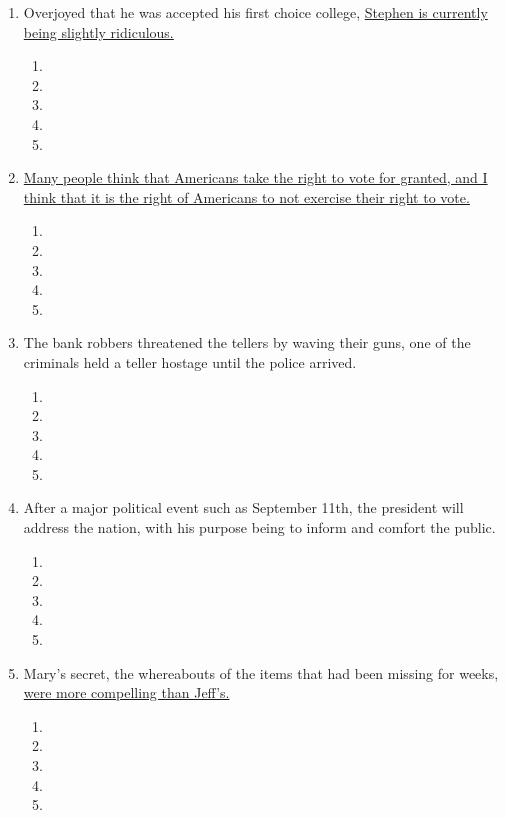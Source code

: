 \begin{enumerate}
\bigskip
\item Overjoyed that he was accepted his first choice college, \ul{Stephen is currently being slightly ridiculous.}

\bigskip
\begin{enumerate}[label=(\Alph*)]
\item\hrulefill
\item\hrulefill
\item\hrulefill
\item\hrulefill
\item\hrulefill
\end{enumerate}

\bigskip
\item \ul{Many people think that Americans take the right to vote for granted, and I think that it is the right of Americans to not exercise their right to vote.}

\bigskip
\begin{enumerate}[label=(\Alph*)]
\item\hrulefill
\item\hrulefill
\item\hrulefill
\item\hrulefill
\item\hrulefill
\end{enumerate}

\bigskip
\item The bank robbers threatened the tellers by waving their guns, one of the criminals held a teller hostage until the police arrived. 

\bigskip
\begin{enumerate}[label=(\Alph*)]
\item\hrulefill
\item\hrulefill
\item\hrulefill
\item\hrulefill
\item\hrulefill
\end{enumerate}

\bigskip
\item After a major political event such as September 11th, the president will address the nation, with his purpose being to inform and comfort the public.

\bigskip
\begin{enumerate}[label=(\Alph*)]
\item\hrulefill
\item\hrulefill
\item\hrulefill
\item\hrulefill
\item\hrulefill
\end{enumerate}

\bigskip
\item Mary's secret, the whereabouts of the items that had been missing for weeks, \ul{were more compelling than Jeff's.}

\bigskip
\begin{enumerate}[label=(\Alph*)]
\item\hrulefill
\item\hrulefill
\item\hrulefill
\item\hrulefill
\item\hrulefill
\end{enumerate}
\end{enumerate}
